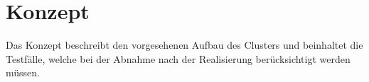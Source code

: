 \newpage
\section{Konzept} 
\label{sec:Konzept}
Das Konzept beschreibt den vorgesehenen Aufbau des Clusters und beinhaltet die Testfälle, welche bei der Abnahme nach der Realisierung berücksichtigt werden müssen.









